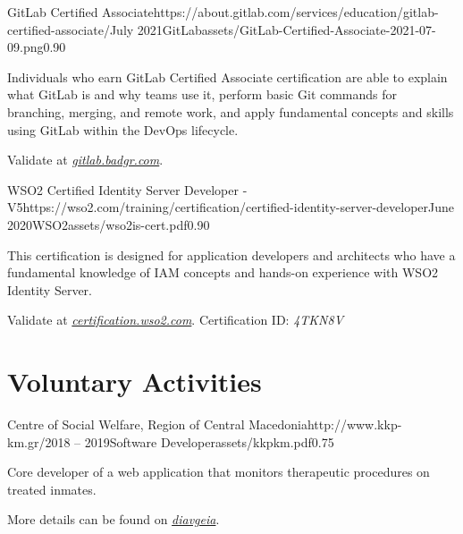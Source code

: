 \documentclass{mycv}
\begin{document}
	\vspace{0.5cm}

    \begin{EntryDatedLogo}{GitLab Certified Associate}{https://about.gitlab.com/services/education/gitlab-certified-associate/}{July 2021}{GitLab}{assets/GitLab-Certified-Associate-2021-07-09.png}{0.90}
		\begin{Itemize}
			\item Individuals who earn GitLab Certified Associate certification are able to explain what GitLab is and why teams use it, perform basic Git commands for branching, merging, and remote work, and apply fundamental concepts and skills using GitLab within the DevOps lifecycle.
			\item Validate at \href{https://gitlab.badgr.com/public/assertions/Hw6j8Th9SyKNj8ehsQkqAw}{\textit{gitlab.badgr.com}}.
		\end{Itemize}
	\end{EntryDatedLogo}

	\vspace{0.5cm}

	\begin{EntryDatedLogo}{WSO2 Certified Identity Server Developer - V5}{https://wso2.com/training/certification/certified-identity-server-developer}{June 2020}{WSO2}{assets/wso2is-cert.pdf}{0.90}
		\begin{Itemize}
			\item This certification is designed for application developers and architects who have a fundamental knowledge of IAM concepts and hands-on experience with WSO2 Identity Server. 
			\item Validate at \href{https://certification.wso2.com}{\textit{certification.wso2.com}}. Certification ID: \textit{4TKN8V}
		\end{Itemize}
	\end{EntryDatedLogo}

	\section{Voluntary Activities}
	\begin{EntryDatedLogo}{Centre of Social Welfare, Region of Central Macedonia}{http://www.kkp-km.gr/}{2018 -- 2019}{Software Developer}{assets/kkpkm.pdf}{0.75}
		\begin{Itemize}
			\item Core developer of a web application that monitors therapeutic procedures on treated inmates.
			\item More details can be found on \href{https://diavgeia.gov.gr/decision/view/\%CE\%A8\%CE\%A6\%CE\%A1\%CE\%93\%CE\%9F\%CE\%9E\%CE\%A7\%CE\%A3-\%CE\%A0\%CE\%93\%CE\%A6}{\textit{diavgeia}}.
		\end{Itemize}
	\end{EntryDatedLogo}
\end{document}

